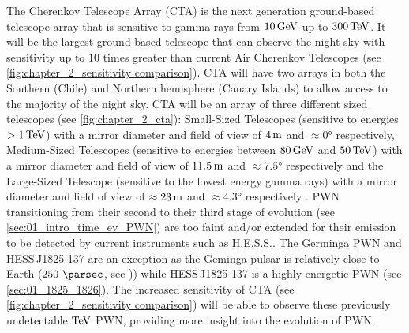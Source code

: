 The Cherenkov Telescope Array (CTA) is the next generation ground-based telescope array that is sensitive to gamma rays from $10\,\si{\giga\electronvolt}$ up to $300\,\TeV$. It will be the largest ground-based telescope that can observe the night sky with sensitivity up to $10$ times greater than current Air Cherenkov Telescopes (see \autoref{fig:chapter_2_sensitivity comparison}). CTA will have two arrays in both the Southern (Chile) and Northern hemisphere (Canary Islands) to allow access to the majority of the night sky.
\newpar
CTA will be an array of three different sized telescopes (see \autoref{fig:chapter_2_cta}): Small-Sized Telescopes (sensitive to energies $>1\,\TeV$) with a mirror diameter and field of view of $4\,\si{\meter}$ and $\approx\ang{0}$ respectively, Medium-Sized Telescopes (sensitive to energies between $80\,\si{\giga\electronvolt}$ and $50\,\TeV$) with a mirror diameter and field of view of $11.5\,\si{\meter}$ and $\approx\ang{7.5}$ respectively and the Large-Sized Telescope (sensitive to the lowest energy gamma rays) with a mirror diameter and field of view of $\approx 23\,\si{\meter}$ and $\approx\ang{4.3}$ respectively \citep{cherenkov_telescope_array,2019scta.book.....C}.
\newpar
PWN transitioning from their second to their third stage of evolution (see \autoref{sec:01_intro_time_ev_PWN}) are too faint and/or extended for their emission to be detected by current instruments such as H.E.S.S.. The Germinga PWN and \mbox{HESS\,J1825-137} are an exception as the Geminga pulsar is relatively close to Earth ($250~\pc$, see \cite{2007Ap&SS.308..225F})) while \mbox{HESS\,J1825-137} is a highly energetic PWN (see \autoref{sec:01_1825_1826}). The increased sensitivity of CTA (see \autoref{fig:chapter_2_sensitivity comparison}) will be able to observe these previously undetectable $\TeV$ PWN, providing more insight into the evolution of PWN.